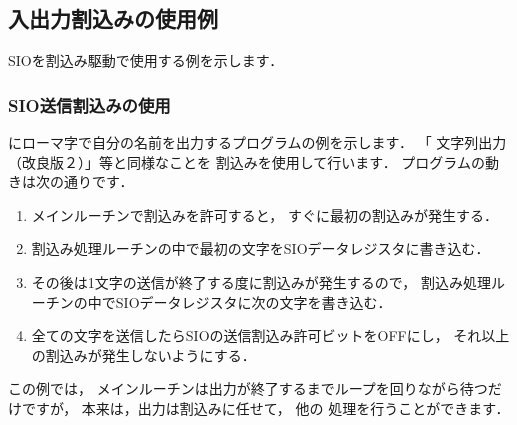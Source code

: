 \subsection{入出力割込みの使用例}
SIOを割込み駆動で使用する例を示します．

\subsubsection{SIO送信割込みの使用}
にローマ字で自分の名前を出力するプログラムの例を示します．
「 文字列出力（改良版２）」等と同様なことを
割込みを使用して行います．
プログラムの動きは次の通りです．

\begin{enumerate}
\item メインルーチンで割込みを許可すると，
すぐに最初の割込みが発生する．
\item 割込み処理ルーチンの中で最初の文字をSIOデータレジスタに書き込む．
\item その後は1文字の送信が終了する度に割込みが発生するので，
割込み処理ルーチンの中でSIOデータレジスタに次の文字を書き込む．
\item 全ての文字を送信したらSIOの送信割込み許可ビットをOFFにし，
それ以上の割込みが発生しないようにする．
\end{enumerate}

この例では，
メインルーチンは出力が終了するまでループを回りながら待つだけですが，
本来は，出力は割込みに任せて，
他の
処理を行うことができます．

